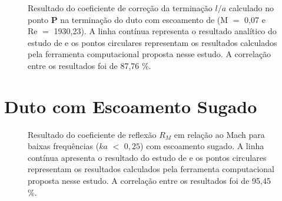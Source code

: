 \newpage
\begin{figure}[ht!]
\centering
  \caption[Coeficiente de Correção da Terminação $l/a$ com Escoamento de Exaustão (M $=$ 0,07)]{Resultado do coeficiente de correção da terminação $l/a$ calculado no ponto $\textbf{P}$ na terminação do duto com escoamento de (M $=$ 0,07 e Re $=$ 1930,23). A linha contínua representa o resultado analítico do estudo de  e os pontos circulares representam os resultados calculados pela ferramenta computacional proposta nesse estudo. A correlação entre os resultados foi de 87,76 \%.}
  \label{fig:loa_boca_007}
\end{figure}


\newpage
\section{Duto com Escoamento Sugado}

\begin{figure}[ht!]
\centering
  \caption[Coeficiente de reflexão $R_{M}$ com escoamento sugado]{Resultado do coeficiente de reflexão $R_{M}$ em relação ao Mach para baixas frequências ($ka$ $<$ $0,25$) com escoamento sugado. A linha contínua apresenta o resultado do estudo de  e os pontos circulares representam os resultados calculados pela ferramenta computacional proposta nesse estudo. A correlação entre os resultados foi de 95,45 \%.}

  \label{fig:abs_r_boca_sugado}
\end{figure}

